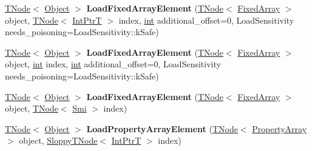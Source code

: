 \begin{DoxyCompactItemize}
\mbox{\label{classv8_1_1internal_1_1CodeStubAssembler_a20164827a7ff25468caf488aa031d608}} 
\mbox{\hyperlink{classv8_1_1internal_1_1compiler_1_1TNode}{T\+Node}}$<$ \mbox{\hyperlink{classv8_1_1internal_1_1Object}{Object}} $>$ {\bfseries Load\+Fixed\+Array\+Element} (\mbox{\hyperlink{classv8_1_1internal_1_1compiler_1_1TNode}{T\+Node}}$<$ \mbox{\hyperlink{classv8_1_1internal_1_1FixedArray}{Fixed\+Array}} $>$ object, \mbox{\hyperlink{classv8_1_1internal_1_1compiler_1_1TNode}{T\+Node}}$<$ \mbox{\hyperlink{structv8_1_1internal_1_1IntPtrT}{Int\+PtrT}} $>$ index, \mbox{\hyperlink{classint}{int}} additional\+\_\+offset=0, Load\+Sensitivity needs\+\_\+poisoning=Load\+Sensitivity\+::k\+Safe)
\item 
\mbox{\label{classv8_1_1internal_1_1CodeStubAssembler_a1e9f4d3388ae1a0ac554e372d2d8070f}} 
\mbox{\hyperlink{classv8_1_1internal_1_1compiler_1_1TNode}{T\+Node}}$<$ \mbox{\hyperlink{classv8_1_1internal_1_1Object}{Object}} $>$ {\bfseries Load\+Fixed\+Array\+Element} (\mbox{\hyperlink{classv8_1_1internal_1_1compiler_1_1TNode}{T\+Node}}$<$ \mbox{\hyperlink{classv8_1_1internal_1_1FixedArray}{Fixed\+Array}} $>$ object, \mbox{\hyperlink{classint}{int}} index, \mbox{\hyperlink{classint}{int}} additional\+\_\+offset=0, Load\+Sensitivity needs\+\_\+poisoning=Load\+Sensitivity\+::k\+Safe)
\item 
\mbox{\label{classv8_1_1internal_1_1CodeStubAssembler_ace46a4f608c9ffa3a88b2d652248630b}} 
\mbox{\hyperlink{classv8_1_1internal_1_1compiler_1_1TNode}{T\+Node}}$<$ \mbox{\hyperlink{classv8_1_1internal_1_1Object}{Object}} $>$ {\bfseries Load\+Fixed\+Array\+Element} (\mbox{\hyperlink{classv8_1_1internal_1_1compiler_1_1TNode}{T\+Node}}$<$ \mbox{\hyperlink{classv8_1_1internal_1_1FixedArray}{Fixed\+Array}} $>$ object, \mbox{\hyperlink{classv8_1_1internal_1_1compiler_1_1TNode}{T\+Node}}$<$ \mbox{\hyperlink{classv8_1_1internal_1_1Smi}{Smi}} $>$ index)
\item 
\mbox{\label{classv8_1_1internal_1_1CodeStubAssembler_a74d7c91142ac161dbb6476df1fcaa22a}} 
\mbox{\hyperlink{classv8_1_1internal_1_1compiler_1_1TNode}{T\+Node}}$<$ \mbox{\hyperlink{classv8_1_1internal_1_1Object}{Object}} $>$ {\bfseries Load\+Property\+Array\+Element} (\mbox{\hyperlink{classv8_1_1internal_1_1compiler_1_1TNode}{T\+Node}}$<$ \mbox{\hyperlink{classv8_1_1internal_1_1PropertyArray}{Property\+Array}} $>$ object, \mbox{\hyperlink{classv8_1_1internal_1_1compiler_1_1SloppyTNode}{Sloppy\+T\+Node}}$<$ \mbox{\hyperlink{structv8_1_1internal_1_1IntPtrT}{Int\+PtrT}} $>$ index)

\end{DoxyCompactItemize}
